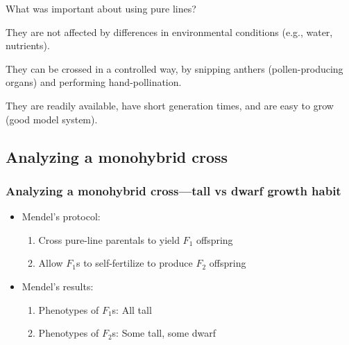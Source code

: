 \begin{frame}
    \begin{clickerquestion}
        \item What was important about using pure lines?
        \begin{clickeroptions}
            \item {}
            \item They are not affected by differences in environmental
                conditions (e.g., water, nutrients).
            \item They can be crossed in a controlled way, by snipping anthers
                (pollen-producing organs) and performing hand-pollination.
            \item They are readily available, have short generation times, and
                are easy to grow (good model system).
        \end{clickeroptions}
    \end{clickerquestion}
\end{frame}

\subsection{Analyzing a monohybrid cross}

\begin{frame}
    \frametitle{Analyzing a monohybrid cross---tall vs dwarf growth habit}

    \begin{itemize}[<+->]
        \item Mendel's  protocol:
            \begin{enumerate}
                \item Cross pure-line parentals to yield $F_1$ offspring
                \item Allow $F_1$s to self-fertilize to produce $F_2$ offspring
            \end{enumerate}

        \item Mendel's results:
            \begin{enumerate}
                \item Phenotypes of $F_1$s: All tall
                \item Phenotypes of $F_2$s: Some tall, some dwarf
            \end{enumerate}
    \end{itemize}

\end{frame}

